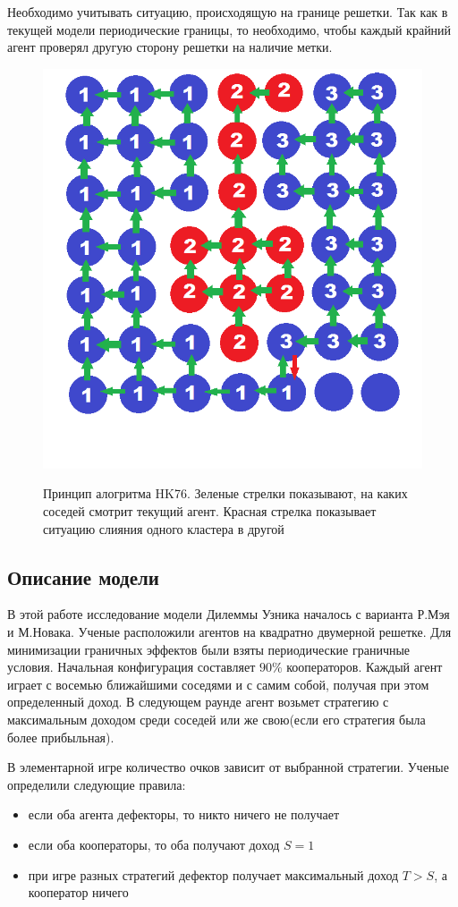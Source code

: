 \documentclass[12pt,a4paper]{article}
\begin{document}
	\par Необходимо учитывать ситуацию, происходящую на границе решетки. Так как в текущей модели периодические границы, то необходимо, чтобы каждый крайний агент проверял другую сторону решетки на наличие метки.
	\begin{figure}[H]
		\centering
		\includegraphics[width=0.5\linewidth]{HKpic2.png}
		\label{hkpic}
		\caption{Принцип алогритма HK76. Зеленые стрелки показывают, на каких соседей смотрит текущий агент. Красная стрелка показывает ситуацию слияния одного кластера в другой}
	\end{figure}
	
	
	\subsection{Описание модели}
	\par В этой работе исследование модели Дилеммы Узника началось с варианта Р.Мэя и М.Новака\cite{may_nowak92}. Ученые расположили агентов на квадратно двумерной решетке. Для минимизации граничных эффектов были взяты периодические граничные условия. Начальная конфигурация составляет $90\%$ кооператоров. Каждый агент играет с восемью ближайшими соседями и с самим собой, получая при этом определенный доход. В следующем раунде агент возьмет стратегию с максимальным доходом среди соседей или же свою(если его стратегия была более прибыльная).
	
	\par В элементарной игре количество очков зависит от выбранной стратегии. Ученые определили следующие правила:
	\begin{itemize}
		\item если оба агента дефекторы, то никто ничего не получает
		\item если оба кооператоры, то оба получают доход $S=1$
		\item при игре разных стратегий дефектор получает максимальный доход $T>S$, а кооператор ничего
	\end{itemize}
	
\end{document}
